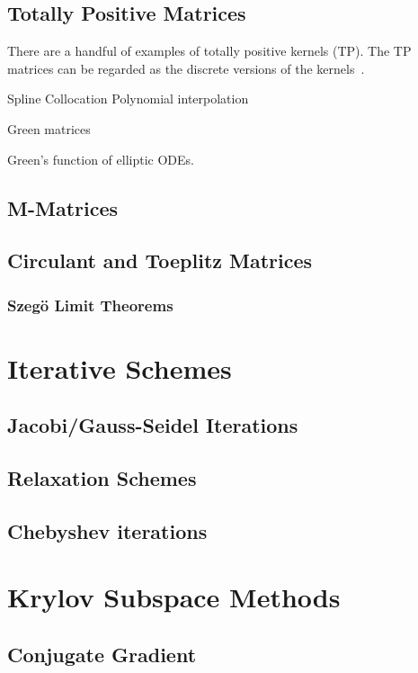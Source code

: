 \subsection{Totally Positive Matrices} 
    There are a handful of examples of totally positive kernels (TP). The TP matrices can be regarded as the discrete versions of the kernels~\cite{karlin1970total}. 
    \begin{example}
        Spline Collocation
Polynomial interpolation
    \end{example}
    \begin{example}
        Green matrices
    \end{example}
\begin{example}
    Green's function of elliptic ODEs. 
\end{example}
\subsection{M-Matrices}
\subsection{Circulant and Toeplitz Matrices}
\subsubsection{Szeg\"o Limit Theorems}
\cite{grenander1958toeplitz}
\section{Iterative Schemes}
\subsection{Jacobi/Gauss-Seidel Iterations}
\subsection{Relaxation Schemes}
\subsection{Chebyshev iterations}
\newpage
\section{Krylov Subspace Methods}
\subsection{Conjugate Gradient}
